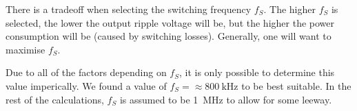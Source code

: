 There is  a  tradeoff  when  selecting the switching frequency $f_S$. The higher
$f_S$  is  selected,  the  lower  the output ripple voltage will be, but the higher the
power consumption will be (caused by switching losses). Generally, one will want
to maximise $f_S$.

Due to all of  the  factors depending on $f_S$, it is only possible to determine
this value imperically. We found a value of $f_S = \approx\SI{800}{\kilo\hertz}$
to be best suitable. In  the  rest  of  the calculations, $f_S$ is assumed to be
\SI{1}{\mega\hertz} to allow for some leeway.

